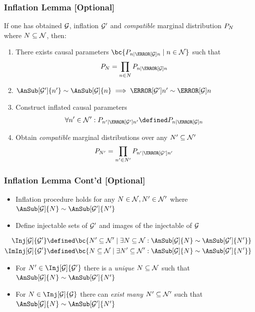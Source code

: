 \documentclass[
    hyperref={bookmarks=false},%
    xcolor={dvipsnames},
]{beamer}
\renewcommand{\term}[1]{\textcolor{Mahogany}{#1}}
\begin{document}
\begin{frame}
    \frametitle{Inflation Lemma [Optional]}
    If one has obtained $\mathcal{G}$, inflation $\mathcal{G}'$ and \textit{compatible} marginal distribution $\prob[N]$ where $N \subseteq \mathcal{N}$, then:
    \begin{enumerate}
        \item There exists causal parameters $\bc{\prob[n\mid\Pa[\graph]{n}] \mid n \in \nodes}$ such that
        \[ \prob[N] = \prod_{n \in N}\prob[n\mid\Pa[\graph]{n}] \]
        \item $\AnSub[\graph']{n'} \sim \AnSub[\graph]{n} \implies \Pa[\graph']{n'} \sim \Pa[\graph]{n}$
        \item Construct \term{inflated causal parameters}
        \[ \forall n' \in \nodes' : \prob[n'\mid\Pa[\graph']{n'}] \defined \prob[n\mid\Pa[\graph]{n}]\]
        \item Obtain \textit{compatible} marginal distributions over any $N' \subseteq \mathcal{N}'$
        \[ \prob[N'] = \prod_{n' \in N'}\prob[n'\mid\Pa[\graph']{n'}] \]
    \end{enumerate}
\end{frame}

\begin{frame}
    \frametitle{Inflation Lemma Cont'd [Optional]}
    \begin{itemize}
        \item Inflation procedure holds for any $N \in \mathcal{N}, N' \in \mathcal{N}'$ where $\AnSub[\graph]{N} \sim \AnSub[\graph']{N'}$
        \item Define \term{injectable sets of $\mathcal{G}'$} and \term{images of the injectable of $\mathcal{G}$}
    \end{itemize}
    \begin{align*}
        \Inj[\graph]{\graph'} &\defined \bc{N' \subseteq \nodes' \mid \exists N \subseteq \nodes : \AnSub[\graph]{N} \sim \AnSub[\graph']{N'}} \\
        \ImInj[\graph]{\graph'} &\defined \bc{N \subseteq \nodes \mid \exists N' \subseteq \nodes' : \AnSub[\graph]{N} \sim \AnSub[\graph']{N'}}
    \end{align*}
    \begin{itemize}
        \item For $N' \in \Inj[\graph]{\graph'}$ there is a \textit{unique} $N \subseteq \mathcal{N}$ such that $\AnSub[\graph]{N} \sim \AnSub[\graph']{N'}$
        \item For $N \in \Inj[\graph]{\graph}$ there can \textit{exist many} $N' \subseteq \mathcal{N}'$ such that $\AnSub[\graph]{N} \sim \AnSub[\graph']{N'}$
    \end{itemize}
\end{frame}
\end{document}
